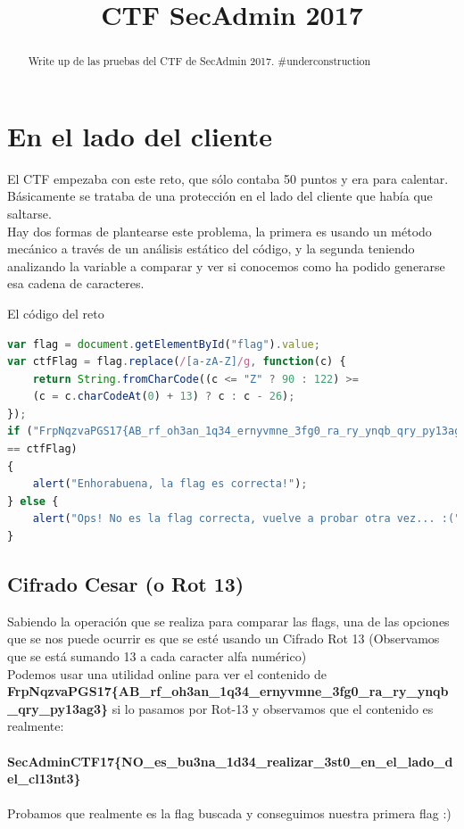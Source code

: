 \documentclass[11pt, spanish]{report}
\title{CTF SecAdmin 2017}
\begin{document}
\maketitle

\begin{abstract}
	Write up de las pruebas del CTF de SecAdmin 2017. \#underconstruction
\end{abstract}


\section*{En el lado del cliente}
El CTF empezaba con este reto, que sólo contaba 50 puntos y era para calentar.
\\
Básicamente se trataba de una protección en el lado del cliente que había que saltarse.
\\
Hay dos formas de plantearse este problema, la primera es usando un método mecánico a través de un análisis estático del código, y la segunda teniendo analizando la variable a comparar y ver si conocemos como ha podido generarse esa cadena de caracteres.

El código del reto
\begin{lstlisting}[language=javascript]
var flag = document.getElementById("flag").value;
var ctfFlag = flag.replace(/[a-zA-Z]/g, function(c) {
	return String.fromCharCode((c <= "Z" ? 90 : 122) >= 
	(c = c.charCodeAt(0) + 13) ? c : c - 26);
});
if ("FrpNqzvaPGS17{AB_rf_oh3an_1q34_ernyvmne_3fg0_ra_ry_ynqb_qry_py13ag3}" 
== ctfFlag) 
{
	alert("Enhorabuena, la flag es correcta!");
} else {
	alert("Ops! No es la flag correcta, vuelve a probar otra vez... :(");
}
\end{lstlisting}

\subsection*{Cifrado Cesar (o Rot 13)}
Sabiendo la operación que se realiza para comparar las flags, una de las opciones que se nos puede ocurrir es que se esté usando un Cifrado Rot 13 (Observamos que se está sumando 13 a cada caracter alfa numérico)\\
Podemos usar una utilidad online para ver el contenido de \\	\textbf{FrpNqzvaPGS17\{AB\_rf\_oh3an\_1q34\_ernyvmne\_3fg0\_ra\_ry\_ynqb\_qry\_py13ag3\}} si lo pasamos por Rot-13 y observamos que el contenido es realmente:\\ \\
\textbf{SecAdminCTF17\{NO\_es\_bu3na\_1d34\_realizar\_3st0\_en\_el\_lado\_del\_cl13nt3\}}
\\ \\
Probamos que realmente es la flag buscada y conseguimos nuestra primera flag :)
\end{document}
